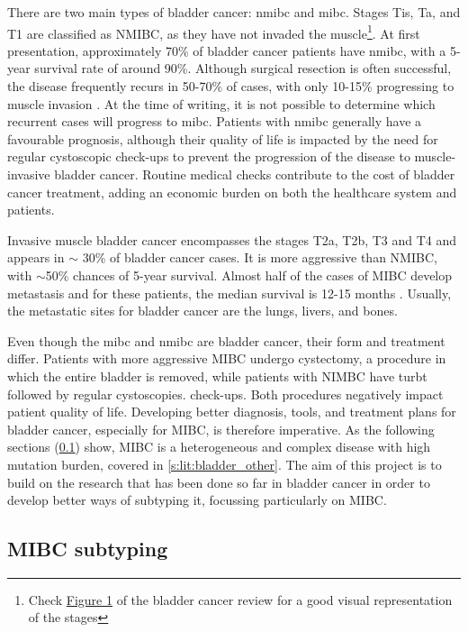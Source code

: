 There are two main types of bladder cancer: \acrfull{nmibc} and \acrfull{mibc}. Stages Tis, Ta, and T1 are classified as NMIBC, as they have not invaded the muscle\footnote{Check \href{https://www.nature.com/articles/nrc3817/figures/1}{Figure 1} of the bladder cancer review \citep{Knowles2015-mu} for a good visual representation of the stages}. At first presentation, approximately 70\% of bladder cancer patients have \acrshort{nmibc}, with a 5-year survival rate of around 90\%. Although surgical resection is often successful, the disease frequently recurs in 50-70\% of cases, with only 10-15\% progressing to muscle invasion \citep{Knowles2015-mu}. At the time of writing, it is not possible to determine which recurrent cases will progress to \acrshort{mibc}. Patients with \acrshort{nmibc} generally have a favourable prognosis, although their quality of life is impacted by the need for regular cystoscopic check-ups to prevent the progression of the disease to muscle-invasive bladder cancer. Routine medical checks contribute to the cost of bladder cancer treatment, adding an economic burden on both the healthcare system and patients.

Invasive muscle bladder cancer encompasses the stages T2a, T2b, T3 and T4 and appears in $\sim$ 30\% of bladder cancer cases. It is more aggressive than NMIBC, with $\sim$50\% chances of 5-year survival. Almost half of the cases of MIBC develop metastasis and for these patients, the median survival is 12-15 months \citep{Knowles2015-mu}. Usually, the metastatic sites for bladder cancer are the lungs, livers, and bones.

Even though the \acrshort{mibc} and \acrshort{nmibc} are bladder cancer, their form and treatment differ. Patients with more aggressive MIBC undergo cystectomy, a procedure in which the entire bladder is removed, while patients with NIMBC have \acrfull{turbt} followed by regular cystoscopies. check-ups. Both procedures negatively impact patient quality of life. Developing better diagnosis, tools, and treatment plans for bladder cancer, especially for MIBC, is therefore imperative. As the following sections (\cref{s:lit:subtypes_mibc}) show, MIBC is a heterogeneous and complex disease with high mutation burden, covered in \cref{s:lit:bladder_other}. The aim of this project is to build on the research that has been done so far in bladder cancer in order to develop better ways of subtyping it, focussing particularly on MIBC.

\subsection{MIBC subtyping} \label{s:lit:subtypes_mibc}

